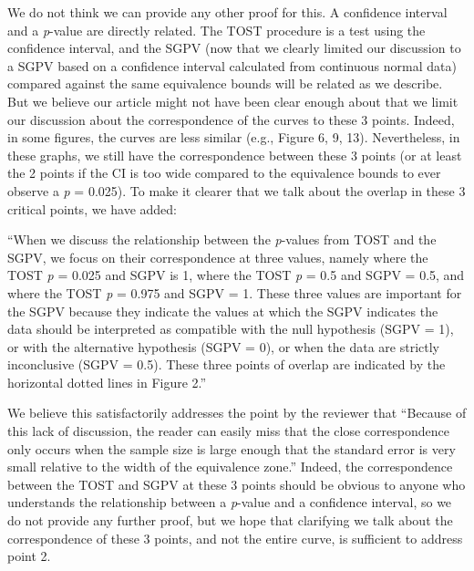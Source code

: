 \documentclass[man]{apa6}
\begin{document}
We do not think we can provide any other proof for this. A confidence
interval and a \emph{p}-value are directly related. The TOST procedure
is a test using the confidence interval, and the SGPV (now that we
clearly limited our discussion to a SGPV based on a confidence interval
calculated from continuous normal data) compared against the same
equivalence bounds will be related as we describe. But we believe our
article might not have been clear enough about that we limit our
discussion about the correspondence of the curves to these 3 points.
Indeed, in some figures, the curves are less similar (e.g., Figure 6, 9,
13). Nevertheless, in these graphs, we still have the correspondence
between these 3 points (or at least the 2 points if the CI is too wide
compared to the equivalence bounds to ever observe a \emph{p} = 0.025).
To make it clearer that we talk about the overlap in these 3 critical
points, we have added:

\enquote{When we discuss the relationship between the \emph{p}-values
from TOST and the SGPV, we focus on their correspondence at three
values, namely where the TOST \emph{p} = 0.025 and SGPV is 1, where the
TOST \emph{p} = 0.5 and SGPV = 0.5, and where the TOST \emph{p} = 0.975
and SGPV = 1. These three values are important for the SGPV because they
indicate the values at which the SGPV indicates the data should be
interpreted as compatible with the null hypothesis (SGPV = 1), or with
the alternative hypothesis (SGPV = 0), or when the data are strictly
inconclusive (SGPV = 0.5). These three points of overlap are indicated
by the horizontal dotted lines in Figure 2.}

We believe this satisfactorily addresses the point by the reviewer that
\enquote{Because of this lack of discussion, the reader can easily miss
that the close correspondence only occurs when the sample size is large
enough that the standard error is very small relative to the width of
the equivalence zone.} Indeed, the correspondence between the TOST and
SGPV at these 3 points should be obvious to anyone who understands the
relationship between a \emph{p}-value and a confidence interval, so we
do not provide any further proof, but we hope that clarifying we talk
about the correspondence of these 3 points, and not the entire curve, is
sufficient to address point 2.
\end{document}
